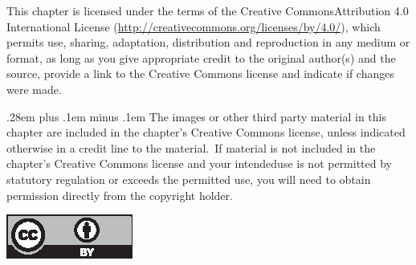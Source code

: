 \documentclass[runningheads]{llncs}
\begin{document}

\vfill

{\small\medskip{} This chapter is licensed under the terms of the Creative Commons\break Attribution 4.0 International License (\url{http://creativecommons.org/licenses/by/4.0/}), which permits use, sharing, adaptation, distribution and reproduction in any medium or format, as long as you give appropriate credit to the original author(s) and the source, provide a link to the Creative Commons license and indicate if changes were made.}

{\small \spaceskip .28em plus .1em minus .1em The images or other third party material in this chapter are included in the chapter's Creative Commons license, unless indicated otherwise in a credit line to the material.~If material is not included in the chapter's Creative Commons license and your intended\break use is not permitted by statutory regulation or exceeds the permitted use, you will need to obtain permission directly from the copyright holder.}

\medskip\noindent\includegraphics{cc_by_4-0.eps}
\end{document}
